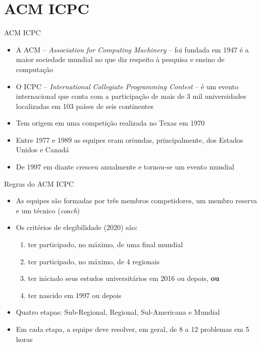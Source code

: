 \section{ACM ICPC}

\begin{frame}[fragile]{ACM ICPC}

    \begin{itemize}
        \item A ACM -- \textit{Association for Computing Machinery} -- foi fundada em 1947 é 
        a maior sociedade mundial no que diz respeito à pesquisa e ensino de computação
        \item O ICPC -- \textit{International Collegiate Programming Contest} -- é um evento
        internacional que conta com a participação de mais de 3 mil universidades localizadas em
        103 países de seis continentes
        \item Tem origem em uma competição realizada no Texas em 1970
        \item Entre 1977 e 1989 as equipes eram oriundas, principalmente, dos Estados Unidos e Canadá
        \item De 1997 em diante cresceu anualmente e tornou-se um evento mundial
    \end{itemize}

\end{frame}

\begin{frame}[fragile]{Regras do ACM ICPC}

    \begin{itemize}
        \item As equipes são formadas por três membros competidores, um membro reserva e um 
        técnico (\textit{coach})
        \item Os critérios de elegibilidade (2020) são:
            \begin{enumerate}
                \item ter participado, no máximo, de uma final mundial
                \item ter participado, no máximo, de 4 regionais
                \item ter iniciado seus estudos universitários em 2016 ou depois, \textbf{ou} 
                \item ter nascido em 1997 ou depois
            \end{enumerate}
        \item Quatro etapas: Sub-Regional, Regional, Sul-Americana e Mundial
        \item Em cada etapa, a equipe deve resolver, em geral, de 8 a 12 problemas em 5 horas
    \end{itemize}

\end{frame}

